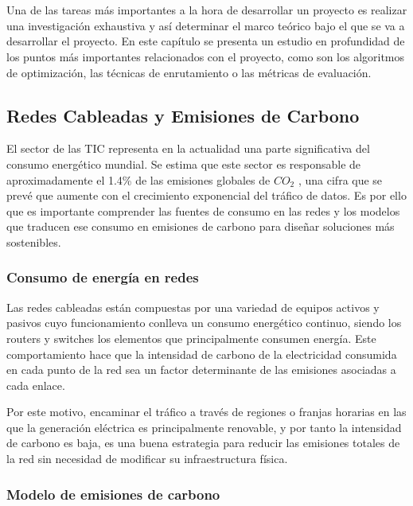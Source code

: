 \chapter{\stateoftheartname} \label{chp:stateoftheart}

Una de las tareas más importantes a la hora de desarrollar un proyecto es realizar una investigación exhaustiva y así determinar el marco teórico bajo el que se va a desarrollar el proyecto. En este capítulo se presenta un estudio en profundidad de los puntos más importantes relacionados con el proyecto, como son los algoritmos de optimización, las técnicas de enrutamiento o las métricas de evaluación.

\section{Redes Cableadas y Emisiones de Carbono}

El sector de las TIC representa en la actualidad una parte significativa del consumo energético mundial. Se estima que este sector es responsable de aproximadamente el 1.4\% de las emisiones globales de $CO_2$ \cite{malmodin2024ict}, una cifra que se prevé que aumente con el crecimiento exponencial del tráfico de datos. Es por ello que es importante comprender las fuentes de consumo en las redes y los modelos que traducen ese consumo en emisiones de carbono para diseñar soluciones más sostenibles.

\subsection{Consumo de energía en redes}

Las redes cableadas están compuestas por una variedad de equipos activos y pasivos cuyo funcionamiento conlleva un consumo energético continuo, siendo los routers y switches \cite{vishwanath2014energy} los elementos que principalmente consumen energía. Este comportamiento hace que la intensidad de carbono de la electricidad consumida en cada punto de la red sea un factor determinante de las emisiones asociadas a cada enlace.

Por este motivo, encaminar el tráfico a través de regiones o franjas horarias en las que la generación eléctrica es principalmente renovable, y por tanto la intensidad de carbono es baja, es una buena estrategia para reducir las emisiones totales de la red sin necesidad de modificar su infraestructura física.

\subsection{Modelo de emisiones de carbono}

